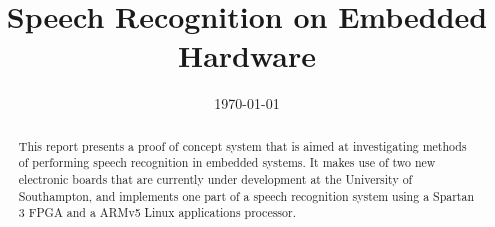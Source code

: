\documentclass{ecsreport}     			%
\begin{document}
\frontmatter
\title      {Speech Recognition on Embedded Hardware}
\addresses  {\groupname\\\deptname\\\univname}
\date       {\today}
\subject    {}
\keywords   {}
\maketitle
\begin{abstract}  %
This report presents a proof of concept system that is aimed at investigating methods of performing speech recognition in embedded systems.  It makes use of two new electronic boards that are currently under development at the University of Southampton, and implements one part of a speech recognition system using a Spartan 3 FPGA and a ARMv5 Linux applications processor.
\end{abstract}
\tableofcontents
\mainmatter



\backmatter

\end{document}
